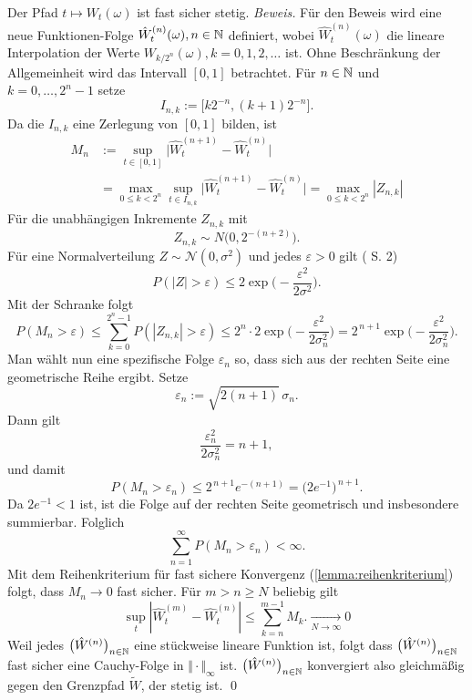 \begin{satz}
Der Pfad $t \mapsto W_t(\omega)$ ist fast sicher stetig.
\textit{Beweis.}
Für den Beweis wird eine neue Funktionen-Folge $\hat W_t^{(n)}(\omega), n \in \Bbb N$
definiert, wobei $\hat W_t^{(n)}(\omega)$ die lineare Interpolation der Werte $W_{k/2^n}(\omega), k=0,1,2,\ldots$ ist. 
Ohne Beschränkung der Allgemeinheit wird das Intervall $[0,1]$ betrachtet. Für $n \in \Bbb N$ und $k=0,\dots,2^n-1$ setze
$$I_{n,k}:=\big[k2^{-n},(k+1)2^{-n}\big].$$
Da die $I_{n,k}$ eine Zerlegung von $[0,1]$ bilden, ist
$$
\begin{aligned}
M_n &:=\sup_{t\in[0,1]}\big|\hat W^{(n+1)}_t-\hat W^{(n)}_t\big| 
\\ &= \max_{0\le k<2^n} \sup_{t\in I_{n,k}} \big|\hat W^{(n+1)}_t-\hat W^{(n)}_t\big| =\max_{0\le k<2^n}|Z_{n,k}|
\end{aligned}
$$
Für die unabhängigen Inkremente $Z_{n,k}$ mit
$$
Z_{n,k}\sim N\!\big(0,2^{-(n+2)}\big).
$$
Für eine Normalverteilung $Z\sim \mathcal N(0,\sigma^2)$ und jedes $\varepsilon>0$ gilt (\cite{boucheron_concentration_2013} S. 2)
$$
P(|Z| >\varepsilon) \le 2\exp\!\Big(-\frac{\varepsilon^2}{2\sigma^2}\Big).
$$
Mit der Schranke folgt
$$
P(M_n>\varepsilon) \le \sum_{k=0}^{2^n-1} P(|Z_{n,k}|>\varepsilon)
\le 2^n\cdot 2\exp\!\Big(-\frac{\varepsilon^2}{2\sigma_n^2}\Big)
= 2^{\,n+1}\exp\!\Big(-\frac{\varepsilon^2}{2\sigma_n^2}\Big).
$$
Man wählt nun eine spezifische Folge $\varepsilon_n$ so, dass sich aus der rechten Seite eine geometrische Reihe ergibt. Setze
$$
\varepsilon_n := \sqrt{2(n+1)}\,\sigma_n.
$$
Dann gilt
$$
\frac{\varepsilon_n^2}{2\sigma_n^2}=n+1,
$$
und damit
$$
P(M_n>\varepsilon_n)\le 2^{\,n+1} e^{-(n+1)} = \big(2e^{-1}\big)^{\,n+1}.
$$
Da $2e^{-1}<1$ ist, ist die Folge auf der rechten Seite geometrisch und insbesondere summierbar. Folglich
$$
\sum_{n=1}^\infty P(M_n>\varepsilon_n) < \infty.
$$
Mit dem Reihenkriterium für fast sichere Konvergenz (\ref{lemma:reihenkriterium}) folgt, dass $M_n\to 0$ fast sicher.
Für $m \gt n \ge N$ beliebig gilt
$$\sup_{t}|\hat W^{(m)}_t - \hat W^{(n)}_t| \leq \sum_{k=n}^{m-1} M_k. \underset{N \to \infty} \longrightarrow 0$$
Weil jedes $\big(\hat W^{(n)}\big)_{n\in\Bbb N}$ eine stückweise lineare Funktion ist, folgt
dass $\big(\hat W^{(n)}\big)_{n\in\Bbb N}$ fast sicher eine Cauchy-Folge in $\Vert \cdot \Vert_{\infty}$ ist.
$\big(\hat W^{(n)}\big)_{n\in\Bbb N}$ konvergiert also gleichmäßig gegen den Grenzpfad $\widetilde W$, der stetig ist. \qed

\end{satz}

\newpage
